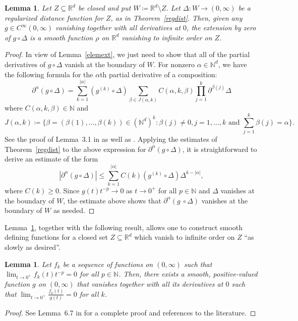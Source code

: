 \documentclass[12pt]{article}
\theoremstyle{plain}
\newtheorem{lemma}[thm]{Lemma}
\theoremstyle{definition}
\newcommand{\R}{\mathbb{R}}
\newcommand{\N}{\mathbb{N}}
\numberwithin{equation}{section}
\begin{document}
\begin{lemma}\label{decayatZ}
Let $Z \subseteq \R^d$ be closed and put $W \coloneqq \R^d \setminus Z$. Let $\Delta:W \to (0,\infty)$ be a regularized distance function for $Z$, as in Theorem~\ref{regdist}. Then, given any $g \in C^\infty(0,\infty)$ vanishing together with all derivatives at $0$,  the extension by zero of  $g\circ \Delta$ is a smooth function $\rho$  on $\R^d$ vanishing to infinite order on $Z$. 
\end{lemma}
\begin{proof}
In view of Lemma~\ref{elemext}, we just need to show that all of the partial derivatives of $g\circ \Delta$ vanish at the boundary of $W$. For nonzero $\alpha \in \N^d$, we  have the following formula for the $\alpha$th partial derivative  of a composition:
\[ \partial^\alpha(g \circ \Delta) = \sum_{k=1}^{|\alpha|} ( g^{(k)} \circ \Delta) \sum_{\beta \in J(\alpha,k)} C(\alpha,k,\beta) \prod_{j=1}^k \partial^{\beta(j)} \Delta \]
where $C(\alpha,k,\beta) \in \N$ and  
\[ J(\alpha,k) \coloneqq\{ \beta = (\beta(1),\ldots, \beta(k)) \in (\N^d)^k : \beta(j) \neq 0,  j=1,\ldots,k \text{ and } {\textstyle\sum_{j=1}^k} \beta(j) = \alpha \}. \]
See the proof of Lemma~3.1 in \cite{Voigt} as well as \cite{Fraenkel}. Applying the estimates of Theorem~\ref{regdist} to the above expression for $\partial^\alpha(g\circ\Delta)$, it is straightforward to derive an estimate of the form
\[ |\partial^\alpha (g \circ \Delta)| \leq \sum_{k=1}^{|\alpha|} C(k)  (g^{(k)} \circ \Delta) \Delta^{k-|\alpha|}, \]
where $C(k) \geq 0$. Since $g(t)t^{-p} \to 0$ as $t\to 0^+$ for all $p \in \N$ and $\Delta$ vanishes at the boundary of $W$, the estimate above shows that $\partial^\alpha(g\ \circ \Delta)$ vanishes at the boundary of $W$ as needed.
\end{proof}






  Lemma~\ref{decayatZ}, together with the following result, allows one to construct smooth defining functions for a closed set $Z \subseteq \R^d$ which vanish to infinite order on $Z$ ``as slowly as desired''. 
\begin{lemma}\label{slowdecay}
Let $f_k$ be a  sequence of functions on $(0,\infty)$ such that  $\lim_{t \to 0^+} f_k(t) t^{-p} = 0$ for all $p \in \N$. Then, there exists a smooth, positive-valued function $g$ on $(0,\infty)$  that vanishes together with all its derivatives at $0$ such that  $\lim_{t \to 0^+} \frac{f_k(t)}{g(t)} =0$ for all $k$.
\end{lemma}
\begin{proof}
See Lemma~6.7 in \cite{Francis[DM]} for a complete proof and references to the literature.
\end{proof}
\end{document}

